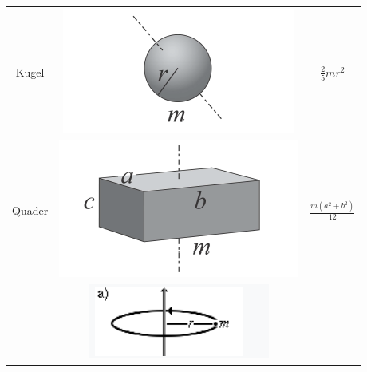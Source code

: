 \begin{tabular}{|c|c|c|}
				& \multirow{5}{8em}{\includegraphics[width=\linewidth]{Bilder/massentraegheitsmomente-kugel.png}} & \\
				& & \\
				Kugel & & $ \frac{2}{5} m r^2 $\\
				& & \\
				& & \\ \hline
				& \multirow{5}{8em}{\includegraphics[width=\linewidth]{Bilder/massentraegheitsmomente-quader.png}} & \\
				& & \\
				Quader & & $ \frac{m (a^2  + b^2)}{12} $\\
				& & \\
				& & \\ \hline
				& \multirow{5}{8em}{\includegraphics[width=\linewidth]{Bilder/Wellen-Optik/J_massepunkt.png}} & \\

\end{tabular}

